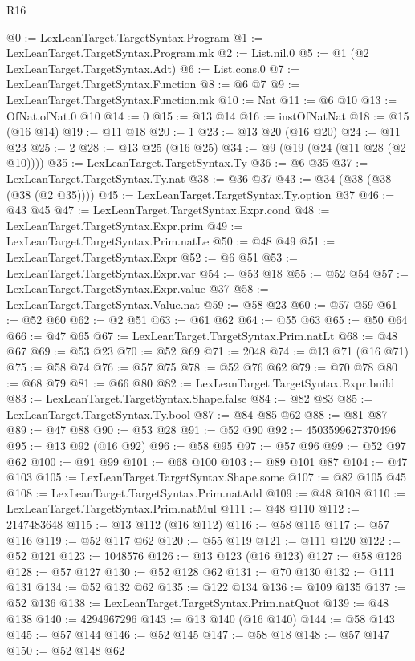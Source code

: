 \begin{lexlean}{R16}
\begin{coremodule}
@0 := LexLeanTarget.TargetSyntax.Program
@1 := LexLeanTarget.TargetSyntax.Program.mk
@2 := List.nil.{0}
@5 := @1 (@2 LexLeanTarget.TargetSyntax.Adt)
@6 := List.cons.{0}
@7 := LexLeanTarget.TargetSyntax.Function
@8 := @6 @7
@9 := LexLeanTarget.TargetSyntax.Function.mk
@10 := Nat
@11 := @6 @10
@13 := OfNat.ofNat.{0} @10
@14 := 0
@15 := @13 @14
@16 := instOfNatNat
@18 := @15 (@16 @14)
@19 := @11 @18
@20 := 1
@23 := @13 @20 (@16 @20)
@24 := @11 @23
@25 := 2
@28 := @13 @25 (@16 @25)
@34 := @9 (@19 (@24 (@11 @28 (@2 @10))))
@35 := LexLeanTarget.TargetSyntax.Ty
@36 := @6 @35
@37 := LexLeanTarget.TargetSyntax.Ty.nat
@38 := @36 @37
@43 := @34 (@38 (@38 (@38 (@2 @35))))
@45 := LexLeanTarget.TargetSyntax.Ty.option @37
@46 := @43 @45
@47 := LexLeanTarget.TargetSyntax.Expr.cond
@48 := LexLeanTarget.TargetSyntax.Expr.prim
@49 := LexLeanTarget.TargetSyntax.Prim.natLe
@50 := @48 @49
@51 := LexLeanTarget.TargetSyntax.Expr
@52 := @6 @51
@53 := LexLeanTarget.TargetSyntax.Expr.var
@54 := @53 @18
@55 := @52 @54
@57 := LexLeanTarget.TargetSyntax.Expr.value @37
@58 := LexLeanTarget.TargetSyntax.Value.nat
@59 := @58 @23
@60 := @57 @59
@61 := @52 @60
@62 := @2 @51
@63 := @61 @62
@64 := @55 @63
@65 := @50 @64
@66 := @47 @65
@67 := LexLeanTarget.TargetSyntax.Prim.natLt
@68 := @48 @67
@69 := @53 @23
@70 := @52 @69
@71 := 2048
@74 := @13 @71 (@16 @71)
@75 := @58 @74
@76 := @57 @75
@78 := @52 @76 @62
@79 := @70 @78
@80 := @68 @79
@81 := @66 @80
@82 := LexLeanTarget.TargetSyntax.Expr.build
@83 := LexLeanTarget.TargetSyntax.Shape.false
@84 := @82 @83
@85 := LexLeanTarget.TargetSyntax.Ty.bool
@87 := @84 @85 @62
@88 := @81 @87
@89 := @47 @88
@90 := @53 @28
@91 := @52 @90
@92 := 4503599627370496
@95 := @13 @92 (@16 @92)
@96 := @58 @95
@97 := @57 @96
@99 := @52 @97 @62
@100 := @91 @99
@101 := @68 @100
@103 := @89 @101 @87
@104 := @47 @103
@105 := LexLeanTarget.TargetSyntax.Shape.some
@107 := @82 @105 @45
@108 := LexLeanTarget.TargetSyntax.Prim.natAdd
@109 := @48 @108
@110 := LexLeanTarget.TargetSyntax.Prim.natMul
@111 := @48 @110
@112 := 2147483648
@115 := @13 @112 (@16 @112)
@116 := @58 @115
@117 := @57 @116
@119 := @52 @117 @62
@120 := @55 @119
@121 := @111 @120
@122 := @52 @121
@123 := 1048576
@126 := @13 @123 (@16 @123)
@127 := @58 @126
@128 := @57 @127
@130 := @52 @128 @62
@131 := @70 @130
@132 := @111 @131
@134 := @52 @132 @62
@135 := @122 @134
@136 := @109 @135
@137 := @52 @136
@138 := LexLeanTarget.TargetSyntax.Prim.natQuot
@139 := @48 @138
@140 := 4294967296
@143 := @13 @140 (@16 @140)
@144 := @58 @143
@145 := @57 @144
@146 := @52 @145
@147 := @58 @18
@148 := @57 @147
@150 := @52 @148 @62

\end{coremodule}
\end{lexlean}
